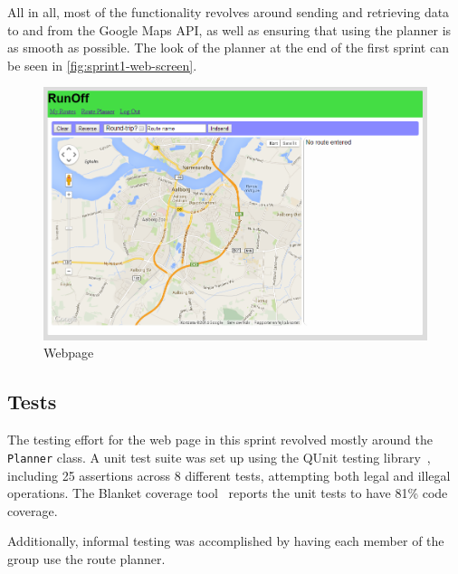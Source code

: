 All in all, most of the functionality revolves around sending and retrieving data to and from the Google Maps \ac{API}, as well as ensuring that using the planner is as smooth as possible. The look of the planner at the end of the first sprint can be seen in \autoref{fig:sprint1-web-screen}.

\begin{figure}[!ht]
	\centering
	\includegraphics[width=\textwidth]{img/webplanner1.png}
	\caption{Webpage}
	\label{fig:sprint1-web-screen}
\end{figure}

\subsection{Tests}

The testing effort for the web page in this sprint revolved mostly around the \texttt{Planner} class. A unit test suite was set up using the QUnit testing library~\citep{qunit}, including 25 assertions across 8 different tests, attempting both legal and illegal operations. The Blanket coverage tool~\citep{blanketjs} reports the unit tests to have 81\% code coverage.

Additionally, informal testing was accomplished by having each member of the group use the route planner.
